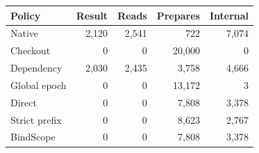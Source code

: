 \begin{tabular}{@{}lrrrr@{}}\toprule
Policy & Result & Reads & Prepares & Internal\\\midrule
Native & 2,120 & 2,541 & 722 & 7,074 \\
Checkout & 0 & 0 & 20,000 & 0 \\
Dependency & 2,030 & 2,435 & 3,758 & 4,666 \\
Global epoch & 0 & 0 & 13,172 & 3 \\
Direct & 0 & 0 & 7,808 & 3,378 \\
Strict prefix & 0 & 0 & 8,623 & 2,767 \\
BindScope & 0 & 0 & 7,808 & 3,378 \\
\bottomrule\end{tabular}
